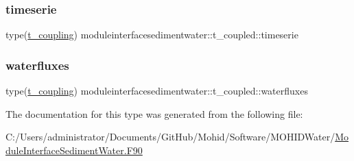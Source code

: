 \mbox{\label{structmoduleinterfacesedimentwater_1_1t__coupled_a5b5329a976ace806454c83f14b23d792}} 
\subsubsection{\texorpdfstring{timeserie}{timeserie}}
{\footnotesize\ttfamily type(\mbox{\hyperlink{structmoduleinterfacesedimentwater_1_1t__coupling}{t\+\_\+coupling}}) moduleinterfacesedimentwater\+::t\+\_\+coupled\+::timeserie\hspace{0.3cm}{\ttfamily [private]}}

\mbox{\label{structmoduleinterfacesedimentwater_1_1t__coupled_a0728c65bb1f18f2ba6433e74bd58225a}} 
\subsubsection{\texorpdfstring{waterfluxes}{waterfluxes}}
{\footnotesize\ttfamily type(\mbox{\hyperlink{structmoduleinterfacesedimentwater_1_1t__coupling}{t\+\_\+coupling}}) moduleinterfacesedimentwater\+::t\+\_\+coupled\+::waterfluxes\hspace{0.3cm}{\ttfamily [private]}}



The documentation for this type was generated from the following file\+:\begin{DoxyCompactItemize}
\item 
C\+:/\+Users/administrator/\+Documents/\+Git\+Hub/\+Mohid/\+Software/\+M\+O\+H\+I\+D\+Water/\mbox{\hyperlink{_module_interface_sediment_water_8_f90}{Module\+Interface\+Sediment\+Water.\+F90}}\end{DoxyCompactItemize}
